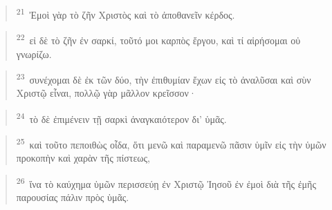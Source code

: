 \documentclass{article}
\newcommand{\currentverse}{1} %
\newcommand{\setcurrentverse}[1]{\renewcommand{\currentverse}{#1}}
\begin{document}
\begin{verse}

\setcurrentverse{21}

\setcounter{footnote}{0}

\textsuperscript{21}~Ἐμοὶ γὰρ τὸ ζῆν Χριστὸς καὶ τὸ ἀποθανεῖν κέρδος.

\end{verse}

\begin{verse}

\setcurrentverse{22}

\setcounter{footnote}{0}

\textsuperscript{22}~εἰ δὲ τὸ ζῆν ἐν σαρκί, τοῦτό μοι καρπὸς ἔργου, καὶ τί αἱρήσομαι οὐ γνωρίζω.

\end{verse}

\begin{verse}

\setcurrentverse{23}

\setcounter{footnote}{0}

\textsuperscript{23}~συνέχομαι δὲ ἐκ τῶν δύο, τὴν ἐπιθυμίαν ἔχων εἰς τὸ ἀναλῦσαι καὶ σὺν Χριστῷ εἶναι, πολλῷ γὰρ μᾶλλον κρεῖσσον·

\end{verse}

\begin{verse}

\setcurrentverse{24}

\setcounter{footnote}{0}

\textsuperscript{24}~τὸ δὲ ἐπιμένειν τῇ σαρκὶ ἀναγκαιότερον δι’ ὑμᾶς.

\end{verse}

\begin{verse}

\setcurrentverse{25}

\setcounter{footnote}{0}

\textsuperscript{25}~καὶ τοῦτο πεποιθὼς οἶδα, ὅτι μενῶ καὶ παραμενῶ πᾶσιν ὑμῖν εἰς τὴν ὑμῶν προκοπὴν καὶ χαρὰν τῆς πίστεως,

\end{verse}

\begin{verse}

\setcurrentverse{26}

\setcounter{footnote}{0}

\textsuperscript{26}~ἵνα τὸ καύχημα ὑμῶν περισσεύῃ ἐν Χριστῷ Ἰησοῦ ἐν ἐμοὶ διὰ τῆς ἐμῆς παρουσίας πάλιν πρὸς ὑμᾶς.

\end{verse}
\end{document}
